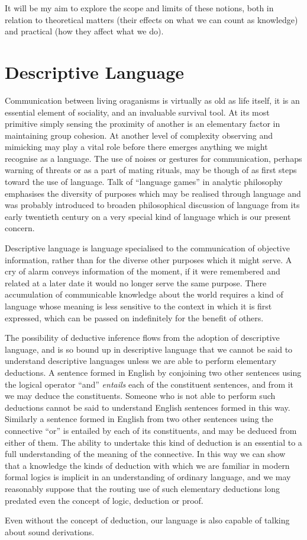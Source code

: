 It will be my aim to explore the scope and limits of these notions, both in relation to theoretical matters (their effects on what we can count as knowledge) and practical (how they affect what we do).

\section{Descriptive Language}

Communication between living oraganisms is virtually as old as life itself, it is an essential element of sociality, and an invaluable survival tool.
At its most primitive simply sensing the proximity of another is an elementary factor in maintaining group cohesion.
At another level of complexity observing and mimicking may play a vital role before there emerges anything we might recognise as a language.
The use of noises or gestures for communication, perhaps warning of threats or as a part of mating rituals, may be though of as first steps toward the use of language.
Talk of ``language games'' in analytic philosophy emphasises the diversity of purposes which may be realised through language and was probably introduced to broaden philosophical discussion of language from its early twentieth century on a very special kind of language which is our present concern.

Descriptive language is language specialised to the communication of objective information, rather than for the diverse other purposes which it might serve.
A cry of alarm conveys information of the moment, if it were remembered and related at a later date it would no longer serve the same purpose.
There accumulation of communicable knowledge about the world requires a kind of language whose meaning is less sensitive to the context in which it is first expressed, which can be passed on indefinitely for the benefit of others.

The possibility of deductive inference flows from the adoption of descriptive language, and is so bound up in descriptive language that we cannot be said to understand descriptive languages unless we are able to perform elementary deductions.
A sentence formed in English by conjoining two other sentences using the logical operator ``and'' {\it entails} each of the constituent sentences, and from it we may deduce the constituents.
Someone who is not able to perform such deductions cannot be said to understand English sentences formed in this way.
Similarly a sentence formed in English from two other sentences using the connective ``or'' is entailed by each of its constituents, and may be deduced from either of them.
The ability to undertake this kind of deduction is an essential to a full understanding of the meaning of the connective.
In this way we can show that a knowledge the kinds of deduction with which we are familiar in modern formal logics is implicit in an understanding of ordinary language, and we may reasonably suppose that the routing use of such elementary deductions long predated even the concept of logic, deduction or proof.

Even without the concept of deduction, our language is also capable of talking about sound derivations.
 


